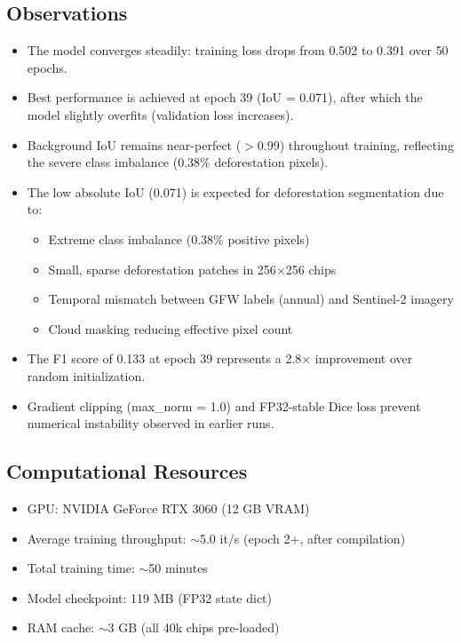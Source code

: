 \documentclass[11pt,a4paper]{article}
\begin{document}
\subsection{Observations}

\begin{itemize}
    \item The model converges steadily: training loss drops from 0.502 to 0.391 over 50 epochs.
    \item Best performance is achieved at epoch 39 (IoU = 0.071), after which the model slightly overfits (validation loss increases).
    \item Background IoU remains near-perfect ($>$0.99) throughout training, reflecting the severe class imbalance (0.38\% deforestation pixels).
    \item The low absolute IoU (0.071) is expected for deforestation segmentation due to:
    \begin{itemize}
        \item Extreme class imbalance (0.38\% positive pixels)
        \item Small, sparse deforestation patches in 256$\times$256 chips
        \item Temporal mismatch between GFW labels (annual) and Sentinel-2 imagery
        \item Cloud masking reducing effective pixel count
    \end{itemize}
    \item The F1 score of 0.133 at epoch 39 represents a 2.8$\times$ improvement over random initialization.
    \item Gradient clipping (max\_norm = 1.0) and FP32-stable Dice loss prevent numerical instability observed in earlier runs.
\end{itemize}

\subsection{Computational Resources}

\begin{itemize}
    \item GPU: NVIDIA GeForce RTX 3060 (12 GB VRAM)
    \item Average training throughput: $\sim$5.0 it/s (epoch 2+, after compilation)
    \item Total training time: $\sim$50 minutes
    \item Model checkpoint: 119 MB (FP32 state dict)
    \item RAM cache: $\sim$3 GB (all 40k chips pre-loaded)
\end{itemize}
\end{document}
